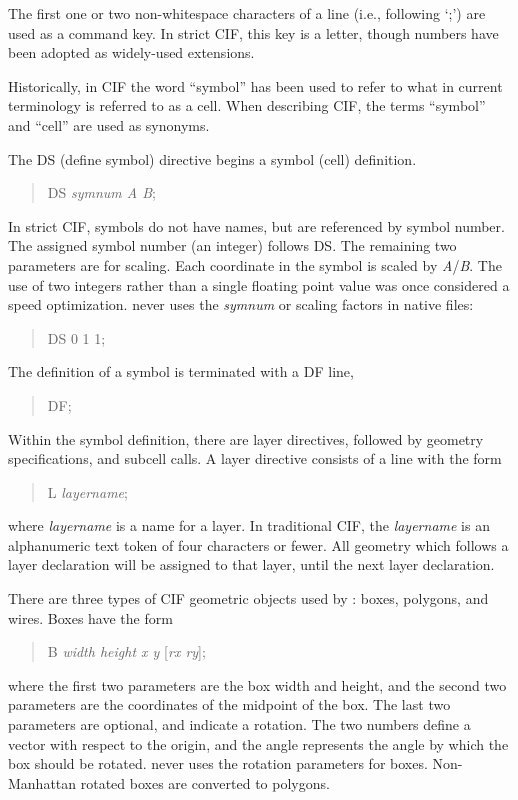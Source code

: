 The first one or two non-whitespace characters of a line (i.e.,
following `;') are used as a command key.  In strict CIF, this key is
a letter, though numbers have been adopted as widely-used extensions.

Historically, in CIF the word ``symbol'' has been used to refer to
what in current terminology is referred to as a cell.  When describing
CIF, the terms ``symbol'' and ``cell'' are used as synonyms.

The {\vt DS} (define symbol) directive begins a symbol (cell) definition.
\begin{quote}\vt
DS {\it symnum A B\/};
\end{quote}
In strict CIF, symbols do not have names, but are referenced by symbol
number.  The assigned symbol number (an integer) follows {\vt DS}. 
The remaining two parameters are for scaling.  Each coordinate in the
symbol is scaled by {\it A\/}/{\it B\/}.  The use of two integers
rather than a single floating point value was once considered a speed
optimization.  {\Xic} never uses the {\it symnum} or scaling factors in
native files:
\begin{quote}\vt
DS 0 1 1;
\end{quote}

The definition of a symbol is terminated with a {\vt DF} line,
\begin{quote}\vt
DF;
\end{quote}

Within the symbol definition, there are layer directives, followed
by geometry specifications, and subcell calls.  A layer directive
consists of a line with the form
\begin{quote}\vt
L {\it layername\/};
\end{quote}
where {\it layername} is a name for a layer.  In traditional CIF, the
{\it layername} is an alphanumeric text token of four characters or
fewer.  All geometry which follows a layer declaration will be
assigned to that layer, until the next layer declaration.

There are three types of CIF geometric objects used by {\Xic}:  boxes,
polygons, and wires.  Boxes have the form
\begin{quote}\vt
B {\it width height x y} [{\it rx ry\/}];
\end{quote}
where the first two parameters are the box width and height, and the
second two parameters are the coordinates of the midpoint of the box. 
The last two parameters are optional, and indicate a rotation.  The
two numbers define a vector with respect to the origin, and the angle
represents the angle by which the box should be rotated.  {\Xic} never
uses the rotation parameters for boxes.  Non-Manhattan rotated boxes
are converted to polygons.

